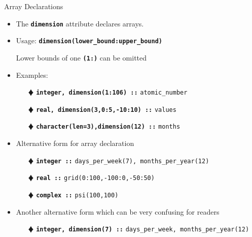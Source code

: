 \documentclass[slidestop,mathserif,compress,xcolor=svgnames]{beamer}
\begin{document}
\begin{frame}[allowframebreaks]
  \framebreak
  \begin{columns}
    \column{11.5cm}
    \begin{block}{\scriptsize Array Declarations}
      \begin{itemize}
        \item The \texttt{\textbf{dimension}} attribute declares arrays.
        \item Usage: \texttt{\textbf{dimension(lower\_bound:upper\_bound)}}
        \item[] Lower bounds of one \textbf{\texttt{(1:)}} can be omitted
        \item Examples:
        \begin{enumerate}
          \item[$\vardiamond$] \texttt{\textbf{integer, dimension(1:106) ::}} \texttt{atomic\_number}
          \item[$\vardiamond$] \texttt{\textbf{real, dimension(3,0:5,-10:10) ::}} \texttt{values}
          \item[$\vardiamond$] \texttt{\textbf{character(len=3),dimension(12) ::}} \texttt{months} 
        \end{enumerate}
        \item Alternative form for array declaration
        \begin{enumerate}
          \item[$\vardiamond$] \texttt{\textbf{integer ::}} \texttt{days\_per\_week(7), months\_per\_year(12)}
          \item[$\vardiamond$] \texttt{\textbf{real ::}} \texttt{grid(0:100,-100:0,-50:50)}
          \item[$\vardiamond$] \texttt{\textbf{complex ::}} \texttt{psi(100,100)}
        \end{enumerate}
        \item Another alternative form which can be very confusing for readers
        \begin{enumerate}
          \item[$\vardiamond$] \texttt{\textbf{integer, dimension(7) ::}} \texttt{days\_per\_week, months\_per\_year(12)}
        \end{enumerate}
      \end{itemize}
    \end{block}
  \end{columns}
  

\end{frame}
\end{document}
